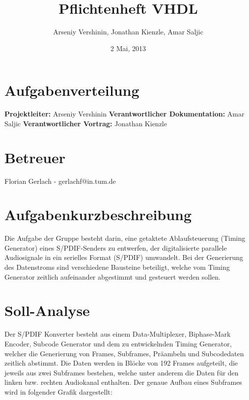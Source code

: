 \documentclass[12pt,a4paper]{article}
\title{Pflichtenheft VHDL}
\author{Arseniy Vershinin, Jonathan Kienzle, Amar Saljic}
\date{2 Mai, 2013}
\begin{document}
\maketitle

\section{Aufgabenverteilung}

{\bf Projektleiter:} Arseniy Vershinin\newline
{\bf Verantwortlicher Dokumentation:} Amar Saljic\newline
{\bf Verantwortlicher Vortrag:} Jonathan Kienzle

\section{Betreuer}

Florian Gerlach - gerlachf@in.tum.de

\section{Aufgabenkurzbeschreibung}
Die Aufgabe der Gruppe besteht darin, eine getaktete Ablaufsteuerung (Timing Generator) eines  S/PDIF-Senders zu entwerfen, der digitalisierte parallele Audiosignale in ein serielles Format (S/PDIF) umwandelt.
Bei der Generierung des Datenstroms sind verschiedene Bausteine beteiligt, welche vom Timing Generator zeitlich aufeinander abgestimmt und gesteuert werden sollen.

\section{Soll-Analyse}

Der S/PDIF Konverter besteht aus einem Data-Multiplexer, Biphase-Mark Encoder, Subcode Generator und dem zu entwickelnden Timing Generator, welcher die Generierung von Frames, Subframes, Präambeln und Subcodedaten zeitlich abstimmt.
Die Daten werden in Blöcke von 192 Frames aufgeteilt, die jeweils aus zwei Subframes bestehen, welche unter anderem die Daten für den linken bzw. rechten Audiokanal enthalten.\newline
Der genaue Aufbau eines Subframes wird in folgender Grafik dargestellt:
\end{document}
